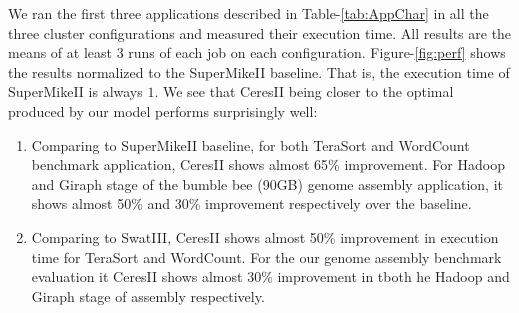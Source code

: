 \documentclass[journal]{IEEEtran}
\begin{document}
We ran the first three applications described in Table-\ref{tab:AppChar} in all the three cluster configurations and measured their execution time. All results are the means of at least 3 runs of each job on each configuration. Figure-\ref{fig:perf} shows the results normalized to the SuperMikeII baseline. That is, the  execution time of SuperMikeII is always $1$. We see that CeresII being closer to the optimal produced by our model performs surprisingly well: 
\begin{enumerate}
\item Comparing to SuperMikeII baseline, for both TeraSort and WordCount benchmark application, CeresII shows almost 65\% improvement. For Hadoop and Giraph stage of the bumble bee (90GB) genome assembly application, it shows almost 50\%  and 30\% improvement respectively over the baseline. 
\item Comparing to SwatIII, CeresII shows almost 50\% improvement in execution time for TeraSort and WordCount. For the our genome assembly benchmark evaluation it CeresII shows almost 30\% improvement in tboth he Hadoop and Giraph stage of assembly respectively. 
\end{enumerate}
\end{document}
